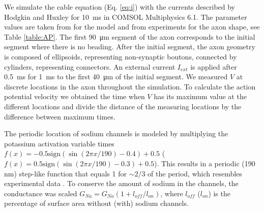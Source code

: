 \documentclass[11pt]{article}
\begin{document}
We simulate the cable equation (Eq. \eqref{eq:i}) with the currents described by Hodgkin and Huxley for \SI{10}{\milli\second} in COMSOL Multiphysics 6.1. The parameter values are taken from \cite{koch2004biophysics} for the model and from experiments for the axon shape, see Table \ref{table:AP}. The first \SI{90}{\micro\meter} segment of the axon corresponds to the initial segment where there is no beading. After the initial segment, the axon geometry is composed of ellipsoids, representing non-synaptic boutons, connected by cylinders, representing connectors. An external current $I_{ext}$ is applied after \SI{0.5}{\milli\second} for \SI{1}{\milli\second} to the first \SI{40}{\micro\meter} of the initial segment. We measured $V$ at discrete locations in the axon throughout the simulation. To calculate the action potential velocity we obtained the time when $V$ has its maximum value at the different locations and divide the distance of the measuring locations by the difference between maximum times. 

The periodic location of sodium channels is modeled by multiplying the potassium activation variable times $f(x) = -0.5 \mathrm{sign} ( \sin (2\pi x/190)-0.4)+0.5 $ ($f(x) = 0.5 \mathrm{sign} ( \sin (2\pi x/190)-0.3)+0.5 $). This results in a periodic (190 nm) step-like function that equals 1 for $\sim 2/3$ of the period, which resembles experimental data \cite{xu2013actin}. To conserve the amount of sodium in the channels, the conductance was scaled $G_{Na} = G_{Na} ( 1 + l_{off}/l_{on})$, where $l_{off}$ ($l_{on}$) is the percentage of surface area without (with) sodium channels.
\end{document}
